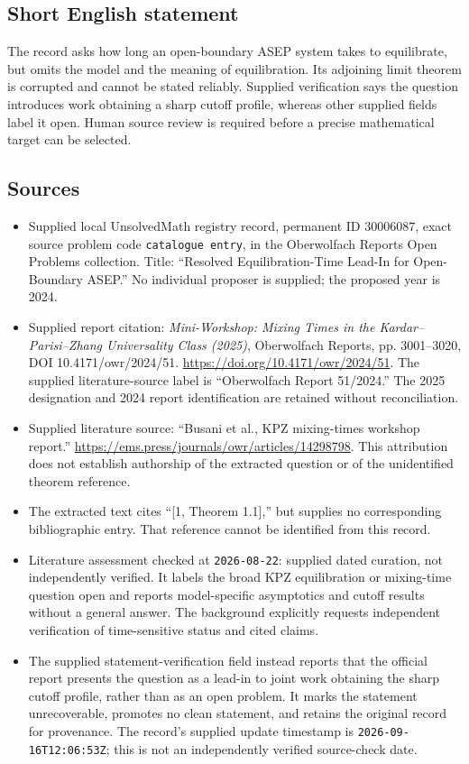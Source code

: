 \documentclass[11pt]{article}
\begin{document}
\subsection{Short English statement}
The record asks how long an open-boundary ASEP system takes to equilibrate, but omits the model and the meaning of equilibration. Its adjoining limit theorem is corrupted and cannot be stated reliably. Supplied verification says the question introduces work obtaining a sharp cutoff profile, whereas other supplied fields label it open. Human source review is required before a precise mathematical target can be selected.
\subsection{Sources}
\begin{itemize}
\item Supplied local UnsolvedMath registry record, permanent ID \(30006087\), exact source problem code \texttt{catalogue entry}, in the Oberwolfach Reports Open Problems collection. Title: ``Resolved Equilibration-Time Lead-In for Open-Boundary ASEP.'' No individual proposer is supplied; the proposed year is 2024.
\item Supplied report citation: \emph{Mini-Workshop: Mixing Times in the Kardar--Parisi--Zhang Universality Class (2025)}, Oberwolfach Reports, pp. 3001--3020, DOI 10.4171/owr/2024/51. \url{https://doi.org/10.4171/owr/2024/51}. The supplied literature-source label is ``Oberwolfach Report 51/2024.'' The 2025 designation and 2024 report identification are retained without reconciliation.
\item Supplied literature source: ``Busani et al., KPZ mixing-times workshop report.'' \url{https://ems.press/journals/owr/articles/14298798}. This attribution does not establish authorship of the extracted question or of the unidentified theorem reference.
\item The extracted text cites ``[1, Theorem 1.1],'' but supplies no corresponding bibliographic entry. That reference cannot be identified from this record.
\item Literature assessment checked at \texttt{2026-08-22}: supplied dated curation, not independently verified. It labels the broad KPZ equilibration or mixing-time question open and reports model-specific asymptotics and cutoff results without a general answer. The background explicitly requests independent verification of time-sensitive status and cited claims.
\item The supplied statement-verification field instead reports that the official report presents the question as a lead-in to joint work obtaining the sharp cutoff profile, rather than as an open problem. It marks the statement unrecoverable, promotes no clean statement, and retains the original record for provenance. The record's supplied update timestamp is \texttt{2026-09-16T12:06:53Z}; this is not an independently verified source-check date.
\end{itemize}
\end{document}
